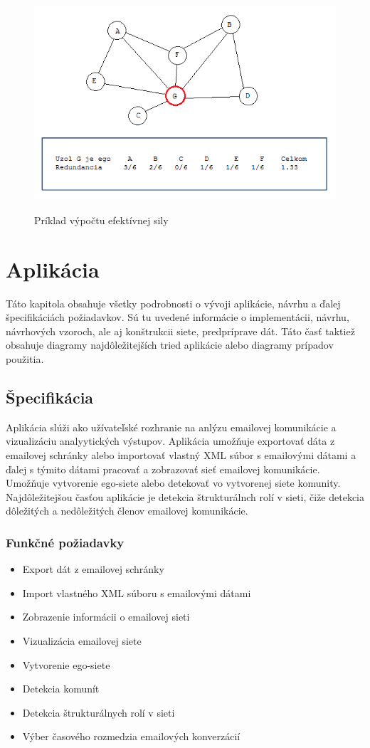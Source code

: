 \documentclass[slovak,master,public,dept460,male,cpdeclaration,oneside]{diploma}
\begin{document}
\begin{figure}[H]
\centering
\includegraphics[width=14cm, height=8cm]{figures/efectivesize}
\caption{Príklad výpočtu efektívnej sily}
\end{figure}


\section{Aplikácia}
Táto kapitola obsahuje všetky podrobnosti o vývoji aplikácie, návrhu a ďalej špecifikáciách požiadavkov. Sú tu uvedené informácie o implementácii, návrhu, návrhových vzoroch, ale aj  konštrukcii siete, predpríprave dát. Táto časť taktiež obsahuje diagramy najdôležitejších tried aplikácie alebo diagramy prípadov použitia. 


\subsection{Špecifikácia}
Aplikácia slúži ako užívateľské rozhranie na anlýzu emailovej komunikácie a vizualizáciu analyytických výstupov. Aplikácia umožňuje exportovať dáta z emailovej schránky alebo importovať vlastný XML súbor s emailovými dátami a ďalej s týmito dátami pracovať a zobrazovať sieť emailovej komunikácie. Umožňuje vytvorenie ego-siete alebo detekovať vo vytvorenej siete komunity. Najdôležitejšou časťou aplikácie je detekcia štrukturálnch rolí v sieti, čiže detekcia dôležitých a nedôležitých členov emailovej komunikácie. 


\subsubsection{Funkčné požiadavky}
\begin{itemize}
\item Export dát z emailovej schránky
\item Import vlastného XML súboru s emailovými dátami
\item Zobrazenie informácii o emailovej sieti
\item Vizualizácia emailovej siete
\item Vytvorenie ego-siete
\item Detekcia komunít
\item Detekcia štrukturálnych rolí v sieti
\item Výber časového rozmedzia emailových konverzácií
\end{itemize}
\end{document}
